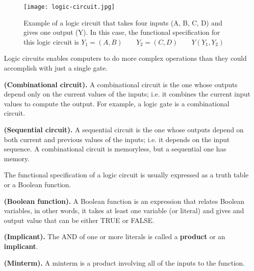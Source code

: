 \begin{figure}[htbp]
    \centerline{\texttt{[image: logic-circuit.jpg]}}
    \caption{Example of a logic circuit that takes four inputs (A, B, C, D) and gives one output (Y). In this case, the functional specification for this logic circuit is 
    $Y_1 = \left( A, B \right)\quad\quad Y_2 = \left( C, D \right) \quad\quad Y\left( Y_1, Y_2 \right)$}
\end{figure}


Logic circuits enables computers to do more complex operations than they could accomplish with just a single gate. 

\begin{definition}
    \textbf{(Combinational circuit).} A combinational circuit is the one whose outputs depend only on the current values of the inputs; i.e. it combines the current input values to compute the output. For example, a logic gate is a combinational circuit. 
\end{definition}
\begin{definition}
    \textbf{(Sequential circuit).} A sequential circuit is the one whose outputs depend on both current and previous values of the inputs; i.e. it depends on the input sequence. A combinational circuit is memoryless, but a sequential one has memory.
\end{definition}

The functional specification of a logic circuit is usually expressed as a truth table or a Boolean function. 


\begin{definition}
    \textbf{(Boolean function).} A Boolean function is an expression that relates Boolean variables, in other words, it takes at least one variable (or literal) and gives and output value that can be either TRUE or FALSE.
\end{definition}

\begin{definition}
    \textbf{(Implicant).} The AND of one or more literals is called a \textbf{product} or an \textbf{implicant}.
\end{definition}
\begin{definition}
    \textbf{(Minterm).} A minterm is a product involving all of the inputs to the function. 
\end{definition}

